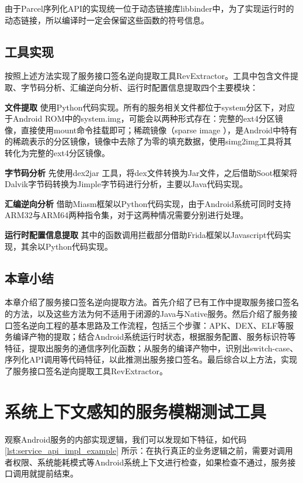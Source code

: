 \documentclass[winfonts,master,twoside]{njuthesis}
\begin{document}
由于Parcel序列化API的实现统一位于动态链接库libbinder中，为了实现运行时的动态链接，所以编译时一定会保留这些函数的符号信息。

\section{工具实现}

按照上述方法实现了服务接口签名逆向提取工具RevExtractor。工具中包含文件提取、字节码分析、汇编逆向分析、运行时配置信息提取四个主要模块：

\textbf{文件提取} \quad 使用Python代码实现。所有的服务相关文件都位于system分区下，对应于Android ROM中的system.img，可能会以两种形式存在：完整的ext4分区镜像，直接使用mount命令挂载即可；稀疏镜像（sparse image \cite{sparse_img}），是Android中特有的稀疏表示的分区镜像，镜像中去除了为零的填充数据，使用simg2img工具将其转化为完整的ext4分区镜像。

\textbf{字节码分析} \quad 先使用dex2jar \cite{dex2jar}工具，将dex文件转换为Jar文件，之后借助Soot框架\cite{soot}将Dalvik字节码转换为Jimple字节码进行分析，主要以Java代码实现。

\textbf{汇编逆向分析} \quad 借助Miasm框架\cite{miasm}以Python代码实现，由于Android系统可同时支持ARM32与ARM64两种指令集，对于这两种情况需要分别进行处理。

\textbf{运行时配置信息提取} \quad 其中的函数调用拦截部分借助Frida框架\cite{frida}以Javascript代码实现，其余以Python代码实现。

\section{本章小结}

本章介绍了服务接口签名逆向提取方法。首先介绍了已有工作中提取服务接口签名的方法，以及这些方法为何不适用于闭源的Java与Native服务。然后介绍了服务接口签名逆向工程的基本思路及工作流程，包括三个步骤：APK、DEX、ELF等服务编译产物的提取；结合Android系统运行时状态，根据服务配置、服务标识符等特征，提取出服务的通信序列化函数；从服务的编译产物中，识别出switch-case、序列化API调用等代码特征，以此推测出服务接口签名。最后综合以上方法，实现了服务接口签名逆向提取工具RevExtractor。


\chapter{系统上下文感知的服务模糊测试工具}

观察Android服务的内部实现逻辑，我们可以发现如下特征，如代码\ref{lst:service_api_impl_example} 所示：在执行真正的业务逻辑之前，需要对调用者权限、系统能耗模式等Android系统上下文进行检查，如果检查不通过，服务接口调用就提前结束。
\end{document}
